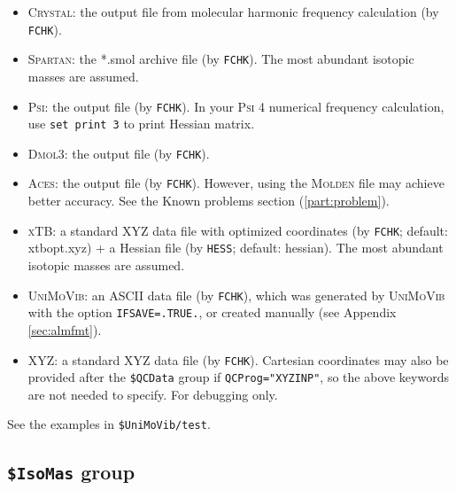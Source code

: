 \documentclass[12pt,english]{extarticle}
\begin{document}
\begin{itemize}
See the Known problems section (\ref{part:problem}).
\item \textsc{Crystal}: the output file from molecular harmonic frequency calculation (by \verb|FCHK|).
\item \textsc{Spartan}: the *.smol archive file (by \verb|FCHK|). The most abundant isotopic masses are assumed.
\item \textsc{Psi}: the output file (by \verb|FCHK|). In your \textsc{Psi} 4 numerical frequency calculation, use \texttt{set print 3} to print Hessian matrix.
\item \textsc{Dmol3}: the output file (by \verb|FCHK|).
\item \textsc{Aces}: the output file (by \verb|FCHK|). However, using the \textsc{Molden} file may achieve better accuracy. See the Known problems section (\ref{part:problem}).
\item \textsc{xTB}: a standard XYZ data file with optimized coordinates (by \verb|FCHK|; default: xtbopt.xyz) + a Hessian file (by \verb|HESS|; default: hessian). The most abundant isotopic masses are assumed.
\item \textsc{UniMoVib}: an ASCII data file (by \verb|FCHK|), which was generated by \textsc{UniMoVib} with the option \verb|IFSAVE=.TRUE.|, or created manually (see Appendix \ref{sec:almfmt}).
\item XYZ: a standard XYZ data file (by \verb|FCHK|). Cartesian coordinates may also be provided after the \texttt{\$QCData} group if \verb|QCProg="XYZINP"|, so the above keywords are not needed to specify. For debugging only.
\end{itemize}

See the examples in \verb|$UniMoVib/test|.


\subsection{\texttt{\$IsoMas} group} \label{sec:inp-isomas}
\end{document}
